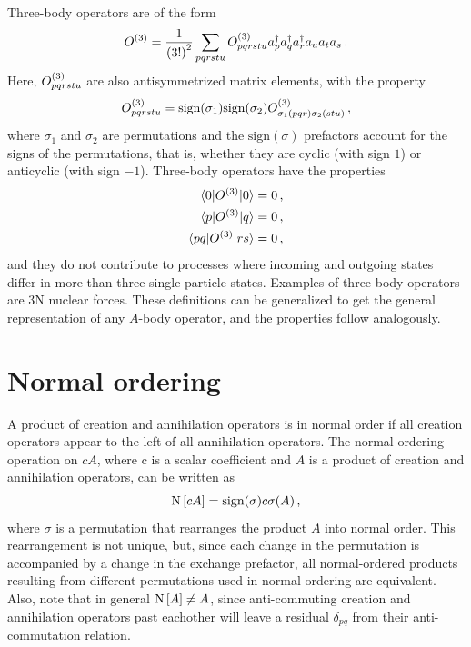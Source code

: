 Three-body operators are of the form
\begin{equation}\label{eq:threebody_op_definition}
  {O}^{(3)} = \frac{1}{{(3!)}^2} \sum_{pqrstu} {O}^{(3)}_{pqrstu} a_{p}^{\dagger} a_{q}^{\dagger} a_{r}^{\dagger} a_{u} a_{t} a_{s}\,.
\end{equation}
Here, ${O}^{(3)}_{pqrstu}$ are also antisymmetrized matrix elements, with the property
\begin{equation}
  {O}^{(3)}_{pqrstu} = \text{sign}(\sigma_1)\text{sign}(\sigma_2){O}^{(3)}_{\sigma_1(pqr)\sigma_2(stu)}\,,
\end{equation}
where $\sigma_1$ and $\sigma_2$ are permutations
and the $\text{sign}(\sigma)$ prefactors account for the signs of the permutations,
that is, whether they are cyclic (with sign $1$)
or anticyclic (with sign $-1$).
Three-body operators have the properties
\begin{align}
  \braket{0 | {O}^{(3)} | 0}   & = 0\,, \\
  \braket{p | {O}^{(3)} | q}   & = 0\,, \\
  \braket{p q| {O}^{(3)} |r s} & = 0\,,
\end{align}
and they do not contribute to processes where incoming and outgoing states
differ in more than three single-particle states.
Examples of three-body operators are 3N nuclear forces.
These definitions can be generalized to get the general representation of any $A$-body operator,
and the properties follow analogously.

\section{Normal ordering}

A product of creation and annihilation operators is in normal order
if all creation operators appear to the left of all annihilation operators.
The normal ordering operation on $c A$,
where c is a scalar coefficient and $A$ is a product of creation and annihilation operators,
can be written as
\begin{equation}
  \text{N}\left[c A\right] = \text{sign}(\sigma) c \sigma(A)\,,
\end{equation}
where $\sigma$ is a permutation that rearranges the product $A$ into normal order.
This rearrangement is not unique,
but, since each change in the permutation is accompanied by a change in the exchange prefactor,
all normal-ordered products resulting from different permutations used in normal ordering
are equivalent.
Also, note that in general $\text{N}\left[A\right] \neq A$,
since anti-commuting creation and annihilation operators past eachother
will leave a residual $\delta_{pq}$ from their anti-commutation relation.

